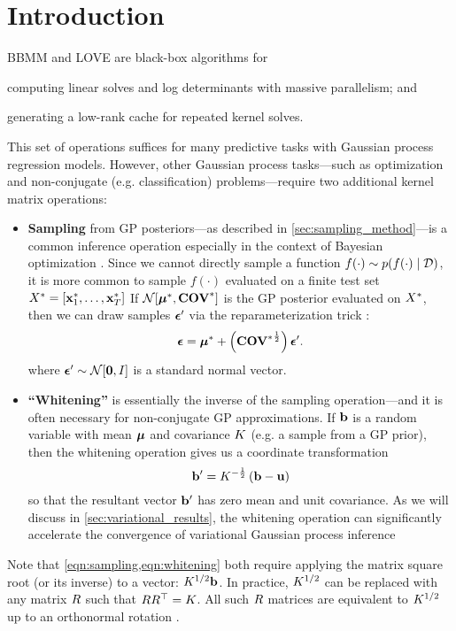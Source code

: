 \section{Introduction}

BBMM and LOVE are black-box algorithms for
%
\begin{enumerate*}
  \item computing linear solves and log determinants with massive parallelism; and
  \item generating a low-rank cache for repeated kernel solves.
\end{enumerate*}
%
This set of operations suffices for many predictive tasks with Gaussian process regression models.
However, other Gaussian process tasks---such as optimization and non-conjugate (e.g. classification) problems---require two additional kernel matrix operations:
\begin{itemize}
  \item {\bf Sampling} from GP posteriors---as described in \cref{sec:sampling_method}---is a common inference operation especially in the context of Bayesian optimization \cite{thompson1933likelihood,frazier2009knowledge,wang2017max}.
  Since we cannot directly sample a function $f(\cdot) \sim p(f(\cdot) \mid \mathcal D)$, it is more common to sample $f(\cdot)$ evaluated on a finite test set $X^* = [\mathbf{x}^*_1, \ldots, \mathbf{x}^*_T]$
  If $\normaldist{\bmeantest}{\Covtest}$ is the GP posterior evaluated on $X^*$, then we can draw samples $\boldsymbol{\epsilon}'$ via the reparameterization trick \cite{kingma2014auto,rezende2014stochastic}:
  \begin{equation}
    \boldsymbol{\epsilon} = \boldsymbol{\mu}^* + \left( {\textbf{COV}^*}^{\frac 1 2} \right) \boldsymbol{\epsilon}'.
    \label{eqn:sampling}
  \end{equation}
  where $\bepsilon' \sim \normaldist{\bzero}{\bI}$ is a standard normal vector.

  \item {\bf ``Whitening''} is essentially the inverse of the sampling operation---and it is often necessary for non-conjugate GP approximations.
  If $\mathbf{b}$ is a random variable with mean $\boldsymbol{\mu}$ and covariance $K$ (e.g. a sample from a GP prior), then the whitening operation gives us a coordinate transformation
  \begin{equation}
    \mathbf{b}' = K^{- \frac 1 2} \left( \mathbf{b} - \mathbf{u} \right)
    \label{eqn:whitening}
  \end{equation}
  so that the resultant vector $\mathbf{b}'$ has zero mean and unit covariance.
  As we will discuss in \cref{sec:variational_results}, the whitening operation can significantly accelerate the convergence of variational Gaussian process inference \cite{kuss2005assessing,hensman2013gaussian,matthews2017scalable}
\end{itemize}
%
Note that \cref{eqn:sampling,eqn:whitening} both require applying the matrix square root (or its inverse) to a vector: $K^{1/2} \mathbf{b}$.
In practice, $K^{1/2}$ can be replaced with any matrix $R$ such that $R R^\top = K$.
All such $R$ matrices are equivalent to $K^{1/2}$ up to an orthonormal rotation \cite{golub2012matrix}.

